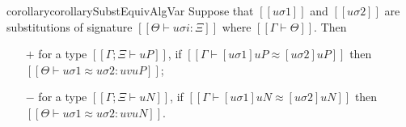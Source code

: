 \begin{restatable}{corollary}{corollarySubstEquivAlgVar}
    \label{lemma:subst-equiv-algovar}
    Suppose that $[[uσ1]]$ and $[[uσ2]]$ are substitutions 
    of signature $[[Θ ⊢ uσi : Ξ]]$ where $[[Γ ⊢ Θ]]$.
    Then 
    \begin{enumerate}
        \item [$+$] for a type $[[Γ; Ξ ⊢ uP]]$, if $[[Γ ⊢ [uσ1]uP ≈ [uσ2]uP]]$ then
            $[[Θ ⊢ uσ1 ≈ uσ2 : uv uP]]$;
        \item [$-$] for a type $[[Γ; Ξ ⊢ uN]]$, if $[[Γ ⊢ [uσ1]uN ≈ [uσ2]uN]]$ then
            $[[Θ ⊢ uσ1 ≈ uσ2 : uv uN]]$.
    \end{enumerate}
\end{restatable}
